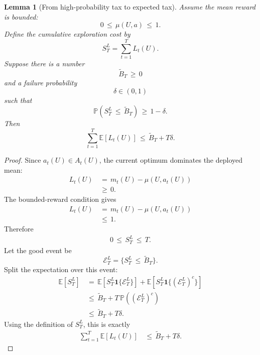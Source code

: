 \documentclass{article} %
\newtheorem{lemma}[theorem]{Lemma}
\begin{document}
\begin{lemma}[From high-probability tax to expected tax]
\label{lem:4}
Assume the mean reward is bounded:
\begin{equation}
\label{eq:app-bounded-mean-for-tax}
0\,\le\, \mu(U,a)\,\le\, 1.
\end{equation}
Define the cumulative exploration cost by
\begin{equation}
\label{eq:app-cumulative-tax}
S_T^{L}
=
\sum_{t=1}^{T}L_t(U).
\end{equation}
Suppose there is a number
\begin{equation}
\label{eq:app-highprob-tax}
\widetilde{B}_T\,\ge\, 0
\end{equation}
and a failure probability
\begin{equation}
\label{eq:app-highprob-delta}
\delta\in(0,1)
\end{equation}
such that
\begin{equation}
\label{eq:app-highprob-tax-event}
\mathbb{P}\!\left(S_T^{L}\,\le\, \widetilde{B}_T\right)
\,\ge\,
1-\delta.
\end{equation}
Then
\begin{equation}
\label{eq:app-highprob-to-expectation}
\sum_{t=1}^{T}\mathbb{E}[L_t(U)]
\,\le\,
\widetilde{B}_T+T\delta.
\end{equation}
\end{lemma}

\begin{proof}
Since \(a_t(U)\in A_t(U)\), the current optimum dominates the deployed mean:
\begin{align}
\label{eq:app-tax-nonnegative}
L_t(U)
&\,=\,
m_t(U)-\mu(U,a_t(U))
\\
&\,\ge\,
0.
\end{align}
The bounded-reward condition gives
\begin{align}
\label{eq:app-tax-upper}
L_t(U)
&\,=\,
m_t(U)-\mu(U,a_t(U))
\\
&\,\le\,
1.
\end{align}
Therefore
\begin{align}
\label{eq:app-cumulative-tax-range}
0
\,\le\,
S_T^{L}
\,\le\,
T.
\end{align}
Let the good event be
\begin{equation}
\label{eq:app-tax-good-event}
\mathcal{E}_T^{L}
=
\{S_T^{L}\,\le\, \widetilde{B}_T\}.
\end{equation}
Split the expectation over this event:
\begin{align}
\label{eq:app-tax-split}
\mathbb{E}[S_T^{L}]
&\,=\,
\mathbb{E}[S_T^{L}\mathbf{1}\{\mathcal{E}_T^{L}\}]
+
\mathbb{E}[S_T^{L}\mathbf{1}\{(\mathcal{E}_T^{L})^c\}]
\\
&\,\le\,
\widetilde{B}_T
+
T\,\mathbb{P}((\mathcal{E}_T^{L})^c)
\\
&\,\le\,
\widetilde{B}_T
+
T\delta.
\end{align}
Using the definition of \(S_T^{L}\), this is exactly
\begin{align}
\label{eq:app-tax-expectation-final}
\sum_{t=1}^{T}\mathbb{E}[L_t(U)]
&\,\le\,
\widetilde{B}_T+T\delta.
\end{align}
\end{proof}
\end{document}
